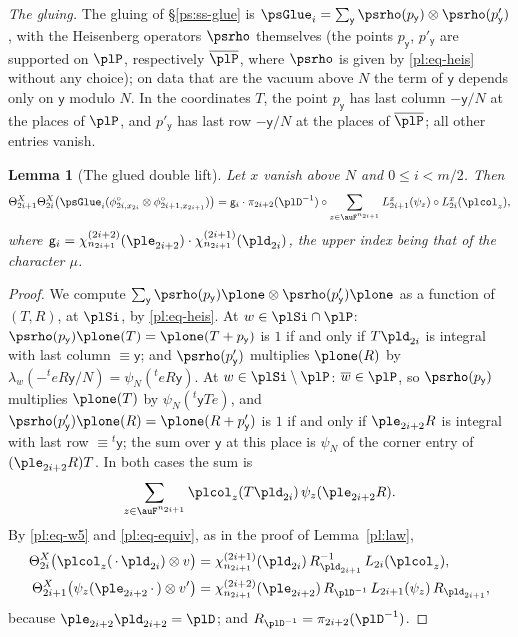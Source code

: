 \documentclass[10pt]{amsart}
\newtheorem{lemma}[theorem]{Lemma}
\theoremstyle{definition}
\theoremstyle{remark}
\providecommand{\aubar}[1]{\overline{#1}}
\begin{document}
\emph{The gluing.} The gluing of \S\ref{ps:ss-glue} is $\psGlue_i=\sum_{\mathsf y}\psrho(p_{\mathsf
y})\otimes\psrho(p'_{\mathsf y})$, with the Heisenberg operators $\psrho$ themselves (the points
$p_{\mathsf y}$, $p'_{\mathsf y}$ are supported on $\plP$, respectively $\aubar\plP$, where
$\psrho$ is given by \eqref{pl:eq-heis} without any choice); on data that are the vacuum above
$N$ the term of $\mathsf y$ depends only on $\mathsf y$ modulo $N$. In the coordinates $T$, the
point $p_{\mathsf y}$ has last column $-\mathsf y/N$ at the places of $\plP$, and $p'_{\mathsf y}$
has last row $-\mathsf y/N$ at the places of $\aubar\plP$; all other entries vanish.

\begin{lemma}[The glued double lift]\label{pl:glue}
Let $x$ vanish above $N$ and $0\le i<m/2$. Then
\[
\Theta^X_{2i+1}\Theta^X_{2i}\bigl(\psGlue_i(\phi^\circ_{2i,x_{2i}}\otimes\phi^\circ_{2i+1,x_{2i+1}})
\bigr)=\mathsf g_i\cdot\pi_{2i+2}(\plD^{-1})\circ\sum_{z\in\auF^{n_{2i+1}}}L^x_{2i+1}(\psi_z)\circ
L^x_{2i}(\plcol_z),
\]
where $\mathsf g_i=\chi^{(2i+2)}_{n_{2i+1}}(\ple_{2i+2})\cdot\chi^{(2i+1)}_{n_{2i+1}}(\pld_{2i})$,
the upper index being that of the character $\mu$.
\end{lemma}
\begin{proof}
We compute $\sum_{\mathsf y}\psrho(p_{\mathsf y})\plone\otimes\psrho(p'_{\mathsf y})\plone$ as a
function of $(T,R)$, at $\plSi$, by \eqref{pl:eq-heis}. At $w\in\plSi\cap\plP$: $\psrho(p_{\mathsf
y})\plone(T)=\plone(T+p_{\mathsf y})$ is $1$ if and only if $T\pld_{2i}$ is integral with last
column $\equiv\mathsf y$; and $\psrho(p'_{\mathsf y})$ multiplies $\plone(R)$ by $\lambda_w(-{}^te
R\mathsf y/N)=\psi_N({}^teR\mathsf y)$. At $w\in\plSi\setminus\plP$: $\aubar w\in\plP$, so
$\psrho(p_{\mathsf y})$ multiplies $\plone(T)$ by $\psi_N({}^t\mathsf yTe)$, and $\psrho(p'_{
\mathsf y})\plone(R)=\plone(R+p'_{\mathsf y})$ is $1$ if and only if $\ple_{2i+2}R$ is integral
with last row $\equiv{}^t\mathsf y$; the sum over $\mathsf y$ at this place is $\psi_N$ of the
corner entry of $(\ple_{2i+2}R)T$. In both cases the sum is
\[
\sum_{z\in\auF^{n_{2i+1}}}\plcol_z(T\pld_{2i})\,\psi_z(\ple_{2i+2}R).
\]
By \eqref{pl:eq-w5} and \eqref{pl:eq-equiv}, as in the proof of Lemma~\ref{pl:law},
\begin{align*}
\Theta^X_{2i}\bigl(\plcol_z(\,\cdot\,\pld_{2i})\otimes v\bigr)&=\chi^{(2i+1)}_{n_{2i+1}}(\pld_{2i})\,
R_{\pld_{2i+1}}^{-1}\,L_{2i}(\plcol_z),\\
\Theta^X_{2i+1}\bigl(\psi_z(\ple_{2i+2}\,\cdot\,)\otimes v'\bigr)&=\chi^{(2i+2)}_{n_{2i+1}}
(\ple_{2i+2})\,R_{\plD^{-1}}\,L_{2i+1}(\psi_z)\,R_{\pld_{2i+1}},
\end{align*}
because $\ple_{2i+2}\pld_{2i+2}=\plD$; and $R_{\plD^{-1}}=\pi_{2i+2}(\plD^{-1})$.
\end{proof}
\end{document}
